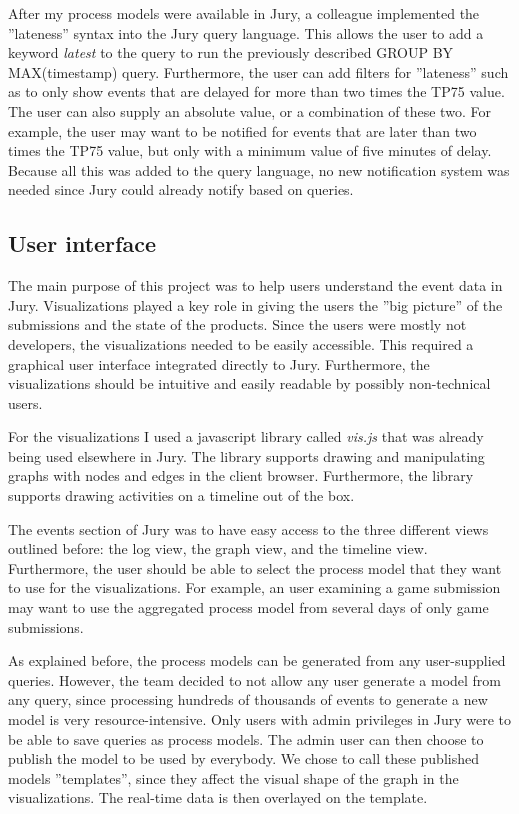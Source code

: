 After my process models were available in Jury, a colleague implemented the ''lateness'' syntax into the Jury query language. 
This allows the user to add a keyword \emph{latest} to the query to run the previously described GROUP BY MAX(timestamp) query.
Furthermore, the user can add filters for ''lateness'' such as to only show events that are delayed for more than two times the TP75 value.
The user can also supply an absolute value, or a combination of these two.
For example, the user may want to be notified for events that are later than two times the TP75 value, but only with a minimum value of five minutes of delay.
Because all this was added to the query language, no new notification system was needed since Jury could already notify based on queries.

\subsection{User interface}

The main purpose of this project was to help users understand the event data in Jury.
Visualizations played a key role in giving the users the ''big picture'' of the submissions and the state of the products.
Since the users were mostly not developers, the visualizations needed to be easily accessible.
This required a graphical user interface integrated directly to Jury.
Furthermore, the visualizations should be intuitive and easily readable by possibly non-technical users.

For the visualizations I used a javascript library called \emph{vis.js}  that was already being used elsewhere in Jury.
The library supports drawing and manipulating graphs with nodes and edges in the client browser.
Furthermore, the library supports drawing activities on a timeline out of the box.


The events section of Jury was to have easy access to the three different views outlined before: the log view, the graph view, and the timeline view. Furthermore, the user should be able to select the process model that they want to use for the visualizations.
For example, an user examining a game submission may want to use the aggregated process model from several days of only game submissions.

As explained before, the process models can be generated from any user-supplied queries.
However, the team decided to not allow any user generate a model from any query, since processing hundreds of thousands of events to generate a new model is very resource-intensive.
Only users with admin privileges in Jury were to be able to save queries as process models.
The admin user can then choose to publish the model to be used by everybody.
We chose to call these published models ''templates'', since they affect the visual shape of the graph in the visualizations.
The real-time data is then overlayed on the template.

